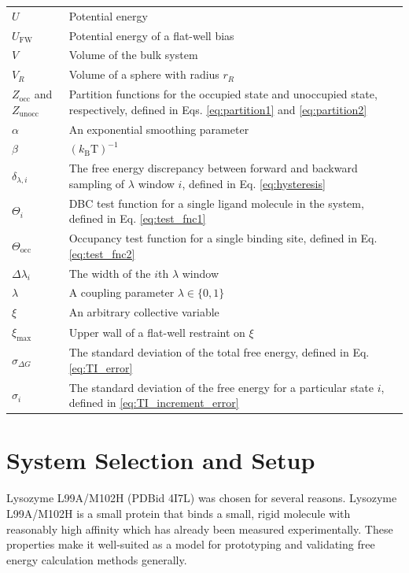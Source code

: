 \documentclass[9pt,tutorial]{Styling/livecoms}
\begin{document}
\begin{table}[H]
{\begin{tabular}{  p{.25\linewidth} | p{.75\linewidth}  }
        $U$ & Potential energy\\
        $U_\mathrm{FW}$ & Potential energy of a flat-well bias\\
        $V$ & Volume of the bulk system\\
        $V_R$ & Volume of a sphere with radius $r_R$\\
        $Z_\mathrm{occ}$ and $Z_\mathrm{unocc}$ & Partition functions for the occupied state and unoccupied state, respectively, defined in Eqs. \ref{eq:partition1} and \ref{eq:partition2}\\
        $\alpha$ & An exponential smoothing parameter\\
        $\beta$ & $(k_\mathrm{B}\mathrm{T})^{-1}$\\
        $\delta_{\lambda,i}$ & The free energy discrepancy between forward and backward sampling of $\lambda$ window $i$, defined in Eq. \ref{eq:hysteresis}\\
        $\Theta_i$ & DBC test function for a single ligand molecule in the system, defined in Eq. \ref{eq:test_fnc1}\\
        $\Theta_\mathrm{occ}$ & Occupancy test function for a single binding site, defined in Eq. \ref{eq:test_fnc2}\\
        $\Delta \lambda_i$ & The width of the $i$th $\lambda$ window\\
        $\lambda$ & A coupling parameter $\lambda\in\{0,1\}$\\
        $\xi$ & An arbitrary collective variable\\
        $\xi_\mathrm{max}$ & Upper wall of a flat-well restraint on $\xi$\\
        $\sigma_{\Delta G}$ & The standard deviation of the total free energy, defined in Eq. \ref{eq:TI_error}\\
        $\sigma_i$ & The standard deviation of the free energy for a particular state $i$, defined in \ref{eq:TI_increment_error}\\
        \hline
    \end{tabular}}
\end{table}

    

\setcounter{section}{0}
\renewcommand\thesection{Appendix~\Alph{section}}
\renewcommand\thesubsection{\thesection.\arabic{subsection}}

\section{System Selection and Setup}
\label{app:motivation}
Lysozyme L99A/M102H (PDBid 4I7L) was chosen for several reasons. Lysozyme L99A/M102H is a small protein that binds a small, rigid molecule with reasonably high affinity which has already been measured experimentally. These properties make it well-suited as a model for prototyping and validating free energy calculation methods generally. 
\end{document}
